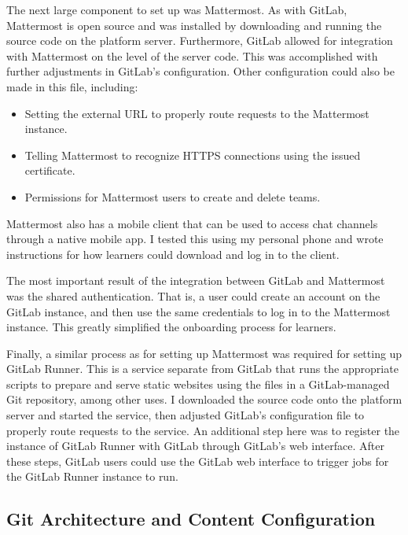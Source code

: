 \documentclass[12pt,twoside]{mitthesis}
\begin{document}
{The next large component to set up was Mattermost. As with GitLab, Mattermost is open source and was installed by downloading and running the source code on the platform server. Furthermore, GitLab allowed for integration with Mattermost on the level of the server code. This was accomplished with further adjustments in GitLab's configuration. Other configuration could also be made in this file, including:
\begin{itemize}
\item Setting the external URL to properly route requests to the Mattermost instance.
\item Telling Mattermost to recognize HTTPS connections using the issued certificate.
\item Permissions for Mattermost users to create and delete teams.
\end{itemize}
Mattermost also has a mobile client that can be used to access chat channels through a native mobile app. I tested this using my personal phone and wrote instructions for how learners could download and log in to the client.

The most important result of the integration between GitLab and Mattermost was the shared authentication. That is, a user could create an account on the GitLab instance, and then use the same credentials to log in to the Mattermost instance. This greatly simplified the onboarding process for learners.

Finally, a similar process as for setting up Mattermost was required for setting up GitLab Runner. This is a service separate from GitLab that runs the appropriate scripts to prepare and serve static websites using the files in a GitLab-managed Git repository, among other uses. I downloaded the source code onto the platform server and started the service, then adjusted GitLab's configuration file to properly route requests to the service. An additional step here was to register the instance of GitLab Runner with GitLab through GitLab's web interface. After these steps, GitLab users could use the GitLab web interface to trigger jobs for the GitLab Runner instance to run.}

\subsection{Git Architecture and Content Configuration}
\end{document}
